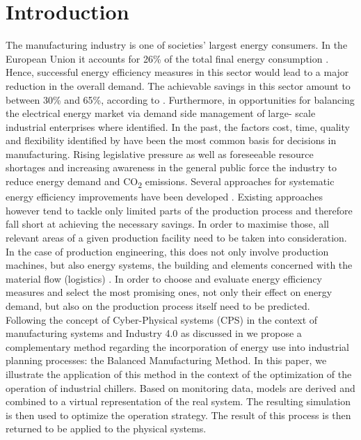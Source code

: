 \documentclass[3p,times,procedia,twocolumn,twoside]{elsarticle}
\begin{document}





\section{Introduction}
\label{main}
The manufacturing industry is one of societies’ largest energy consumers. In the European Union it accounts for 26\% of the total final energy consumption \cite{Eurostata}. Hence, successful energy efficiency measures in this sector would lead to a major reduction in the overall demand. The achievable savings in this sector amount to between 30\% and 65\%, according to \cite{Bonneville2006a}. Furthermore, in \cite{Paulus2011} opportunities for balancing the electrical energy market via demand side management of large- scale industrial enterprises where identified. In the past, the factors cost, time, quality and flexibility identified by \cite{Chryssolouris1992} have been the most common basis for decisions in manufacturing.  Rising legislative pressure as well as foreseeable resource shortages and increasing awareness in the general public force the industry to reduce energy demand and CO\textsubscript{2} emissions. Several approaches for systematic energy efficiency improvements have been developed \cite{Thiede2012,Introna2014,May2015,Kovacic2013}. Existing approaches however tend to tackle only limited parts of the production process \cite{Herrmann2011,Kara2011,Weinert2011} and therefore fall short at achieving the necessary savings. In order to maximise those, all relevant areas of a given production facility need to be taken into consideration. In the case of production engineering, this does not only involve production machines, but also energy systems, the building and elements concerned with the material flow (logistics) \cite{Hesselbach2008,Bleicher2014a}. In order to choose and evaluate energy efficiency measures and select the most promising ones, not only their effect on energy demand, but also on the production process itself need to be predicted.\\
Following the concept of Cyber-Physical systems (CPS) in the context of manufacturing systems and Industry 4.0 as discussed in \cite{Jazdi2014,Monostori2014} we propose a complementary method regarding the incorporation of energy use into industrial planning processes: the Balanced Manufacturing Method. In this paper, we illustrate the application of this method in the context of the optimization of the operation of industrial chillers. Based on monitoring data, models are derived and combined to a virtual representation of the real system. The resulting simulation is then used to optimize the operation strategy. The result of this process is then returned to be applied to the physical systems.\\
\end{document}
